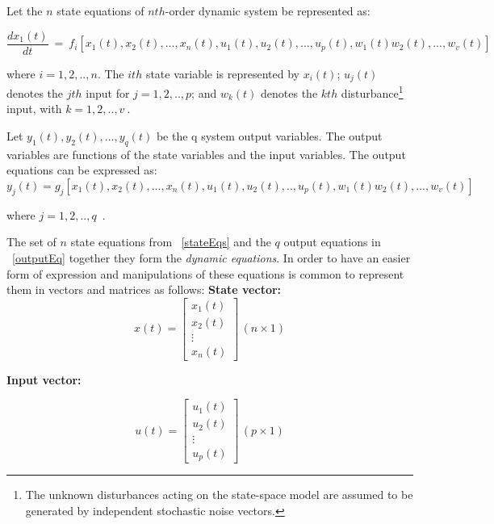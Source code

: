 Let the $n$ state equations of $nth$-order dynamic system be represented as:

\begin{equation}
	\frac{dx_1 (t)}{dt} ~ = ~ f_i [x_1(t),x_2(t),...,x_n(t), u_1(t),u_2(t),...,u_p(t),w_1(t)w_2(t),...,w_v(t)]
	\label{stateEqs}
\end{equation}

 where $i=1,2,..,n$. The $ith$ state variable is represented by $x_i(t)$; $u_j(t)$ denotes the $jth$ input for $j=1,2,..,p$; and $w_k(t)$ denotes the $kth$ disturbance\footnote{The unknown disturbances acting on the state-space model are assumed to be generated by independent stochastic noise vectors. } input, with $k=1,2,..,v~$.\smallskip
 
 Let $y_1(t),y_2(t),...,y_q(t) $ be the q system output variables. The output variables are functions of the state variables  and the input variables. The output equations can be expressed as:
 \begin{equation}
 	y_j(t)=g_j[x_1(t),x_2(t),...,x_n(t),u_1(t),u_2(t),..,u_p(t),w_1(t)w_2(t),...,w_v(t)]
 \label{outputEq}
 \end{equation}
 
 where $j=1,2,..,q$~.
 \smallskip
 
 The set of $n$ state equations from ~\ref{stateEqs} and the $q$ output equations in ~\ref{outputEq} together they form the \textit{dynamic equations}. In order to have an easier form of expression and manipulations of these equations is common to represent them in vectors and matrices as follows: \smallskip
 \textbf{State vector:}
 \begin{equation}
 x(t)=
 \left[
 	\begin{matrix}
 	x_1(t)\\
 	x_2(t)\\
 	\vdots\\
 	x_n(t)
 	\end{matrix}
 	\right] \, (n\times 1)
 \end{equation}
 
\textbf{ Input vector:}
 
  \begin{equation}
 u(t)=
 \left[
 \begin{matrix}
 u_1(t)\\
 u_2(t)\\
 \vdots\\
 u_p(t)
 \end{matrix}
 \right] \, (p\times 1)
 \end{equation}
 
